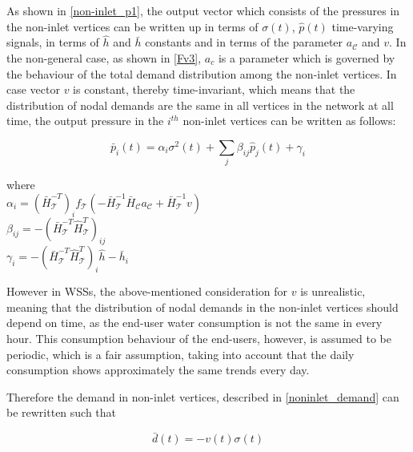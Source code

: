 As shown in \eqref{non-inlet_p1}, the output vector which consists of the pressures in the non-inlet vertices can be written up in terms of $\sigma(t)$, $\hat{p}(t)$ time-varying signals, in terms of $\hat{h}$ and $\bar{h}$ constants and in terms of the parameter $a_{\mathcal{C}}$ and $v$. In the non-general case, as shown in \eqref{Fv3}, $a_c$ is a parameter which is governed by the behaviour of the total demand distribution among the non-inlet vertices. In case vector $v$ is constant, thereby time-invariant, which means that the distribution of nodal demands are the same in all vertices in the network at all time, the output pressure in the $i^{th}$ non-inlet vertices can be written as follows: 

\begin{equation}
\label{model_multiinlet1}
\bar{p}_i(t) = \alpha_i \sigma^2(t) + \sum_j \beta_{ij} \hat{p}_j(t) + \gamma_i
\end{equation}

  \begin{minipage}[t]{0.50\textwidth}
where\\
\hspace*{8mm} $ \alpha_i = (\bar{H}^{-T}_{\mathcal{T}})_i f_{\mathcal{T}}(-\bar{H}^{-1}_{\mathcal{T}} \bar{H}_{\mathcal{C}} a_{\mathcal{C}} + \bar{H}^{-1}_{\mathcal{T}} v)$ \\
\vspace*{7pt}
\hspace*{8mm} $ \beta_{ij} = -(\bar{H}^{-T}_{\mathcal{T}}\hat{H}^{T}_{\mathcal{T}})_{ij} $ \\
\vspace*{7pt}
\hspace*{8mm} $ \gamma_{i} = -(\bar{H}^{-T}_{\mathcal{T}}\hat{H}^{T}_{\mathcal{T}})_{i}\hat{h} - \bar{h}_i $ 

\end{minipage}

However in WSSs, the above-mentioned consideration for $v$ is unrealistic, meaning that the distribution of nodal demands in the non-inlet vertices should depend on time, as the end-user water consumption is not the same in every hour. This consumption behaviour of the end-users, however, is assumed to be periodic, which is a fair assumption, taking into account that the daily consumption shows approximately the same trends every day. 

Therefore the demand in non-inlet vertices, described in \eqref{noninlet_demand} can be rewritten such that

\begin{equation}
\label{noninlet_demand_time_varying}
\bar{d}(t) = - v(t) \sigma(t)
\end{equation}

